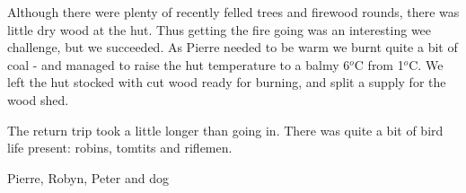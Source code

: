 \documentclass[12pt]{article} %
\begin{document}
Although there were plenty of recently felled trees and firewood rounds, there was little dry wood at the hut.  Thus getting the fire going was an interesting wee challenge, but we succeeded.  As Pierre needed to be warm we burnt quite a bit of coal - and managed to raise the hut temperature to a balmy 6$^o$C from 1$^o$C.  We left the hut stocked with cut wood ready for burning, and split a supply for the wood shed.

The return trip took a little longer than going in.  There was quite a bit of bird life present: robins, tomtits and riflemen.


\begin{flushright}
Pierre, Robyn, Peter and dog
\end{flushright}
\end{document}

